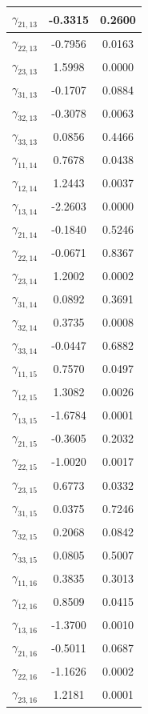 \documentclass[a4paper, 12pt, openany, oneside, brazil]{abntex2}
\begin{document}
\begin{apendicesenv}
\begin{longtable}{|c|c|c|}
	\hline
	$\gamma_{21,13}$ & -0.3315 & 0.2600 \\
	\hline
	$\gamma_{22,13}$ & -0.7956 & 0.0163 \\
	\hline
	$\gamma_{23,13}$ & 1.5998 & 0.0000 \\
	\hline
	$\gamma_{31,13}$ & -0.1707 & 0.0884 \\
	\hline
	$\gamma_{32,13}$ & -0.3078 & 0.0063 \\
	\hline
	$\gamma_{33,13}$ & 0.0856 & 0.4466 \\
	\hline
	$\gamma_{11,14}$ & 0.7678 & 0.0438 \\
	\hline
	$\gamma_{12,14}$ & 1.2443 & 0.0037 \\
	\hline
	$\gamma_{13,14}$ & -2.2603 & 0.0000 \\
	\hline
	$\gamma_{21,14}$ & -0.1840 & 0.5246 \\
	\hline
	$\gamma_{22,14}$ & -0.0671 & 0.8367 \\
	\hline
	$\gamma_{23,14}$ & 1.2002 & 0.0002 \\
	\hline
	$\gamma_{31,14}$ & 0.0892 & 0.3691 \\
	\hline
	$\gamma_{32,14}$ & 0.3735 & 0.0008 \\
	\hline
	$\gamma_{33,14}$ & -0.0447 & 0.6882 \\
	\hline
	$\gamma_{11,15}$ & 0.7570 & 0.0497 \\
	\hline
	$\gamma_{12,15}$ & 1.3082 & 0.0026 \\
	\hline
	$\gamma_{13,15}$ & -1.6784 & 0.0001 \\
	\hline
	$\gamma_{21,15}$ & -0.3605 & 0.2032 \\
	\hline
	$\gamma_{22,15}$ & -1.0020 & 0.0017 \\
	\hline
	$\gamma_{23,15}$ & 0.6773 & 0.0332 \\
	\hline
	$\gamma_{31,15}$ & 0.0375 & 0.7246 \\
	\hline
	$\gamma_{32,15}$ & 0.2068 & 0.0842 \\
	\hline
	$\gamma_{33,15}$ & 0.0805 & 0.5007 \\
	\hline
	$\gamma_{11,16}$ & 0.3835 & 0.3013 \\
	\hline
	$\gamma_{12,16}$ & 0.8509 & 0.0415 \\
	\hline
	$\gamma_{13,16}$ & -1.3700 & 0.0010 \\
	\hline
	$\gamma_{21,16}$ & -0.5011 & 0.0687 \\
	\hline
	$\gamma_{22,16}$ & -1.1626 & 0.0002 \\
	\hline
	$\gamma_{23,16}$ & 1.2181 & 0.0001 \\

\end{longtable}
\end{apendicesenv}
\end{document}
